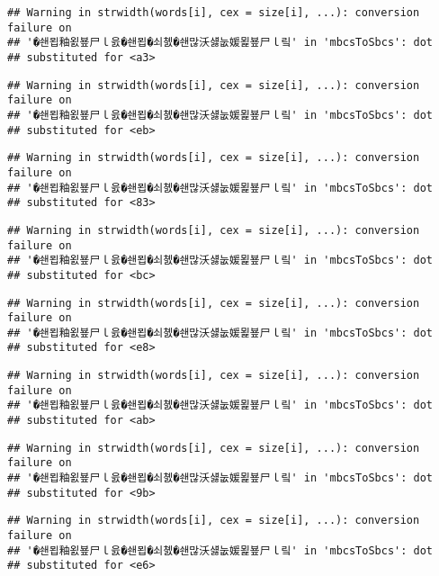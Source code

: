 \documentclass[]{article}
\begin{document}
\begin{verbatim}
## Warning in strwidth(words[i], cex = size[i], ...): conversion failure on
## '�쇈묍釉욄뵾尸ｌ읈�쇈묍�쇠쳸�쇈많沃섏눖媛묉뵾尸ｌ맄' in 'mbcsToSbcs': dot
## substituted for <a3>
\end{verbatim}

\begin{verbatim}
## Warning in strwidth(words[i], cex = size[i], ...): conversion failure on
## '�쇈묍釉욄뵾尸ｌ읈�쇈묍�쇠쳸�쇈많沃섏눖媛묉뵾尸ｌ맄' in 'mbcsToSbcs': dot
## substituted for <eb>
\end{verbatim}

\begin{verbatim}
## Warning in strwidth(words[i], cex = size[i], ...): conversion failure on
## '�쇈묍釉욄뵾尸ｌ읈�쇈묍�쇠쳸�쇈많沃섏눖媛묉뵾尸ｌ맄' in 'mbcsToSbcs': dot
## substituted for <83>
\end{verbatim}

\begin{verbatim}
## Warning in strwidth(words[i], cex = size[i], ...): conversion failure on
## '�쇈묍釉욄뵾尸ｌ읈�쇈묍�쇠쳸�쇈많沃섏눖媛묉뵾尸ｌ맄' in 'mbcsToSbcs': dot
## substituted for <bc>
\end{verbatim}

\begin{verbatim}
## Warning in strwidth(words[i], cex = size[i], ...): conversion failure on
## '�쇈묍釉욄뵾尸ｌ읈�쇈묍�쇠쳸�쇈많沃섏눖媛묉뵾尸ｌ맄' in 'mbcsToSbcs': dot
## substituted for <e8>
\end{verbatim}

\begin{verbatim}
## Warning in strwidth(words[i], cex = size[i], ...): conversion failure on
## '�쇈묍釉욄뵾尸ｌ읈�쇈묍�쇠쳸�쇈많沃섏눖媛묉뵾尸ｌ맄' in 'mbcsToSbcs': dot
## substituted for <ab>
\end{verbatim}

\begin{verbatim}
## Warning in strwidth(words[i], cex = size[i], ...): conversion failure on
## '�쇈묍釉욄뵾尸ｌ읈�쇈묍�쇠쳸�쇈많沃섏눖媛묉뵾尸ｌ맄' in 'mbcsToSbcs': dot
## substituted for <9b>
\end{verbatim}

\begin{verbatim}
## Warning in strwidth(words[i], cex = size[i], ...): conversion failure on
## '�쇈묍釉욄뵾尸ｌ읈�쇈묍�쇠쳸�쇈많沃섏눖媛묉뵾尸ｌ맄' in 'mbcsToSbcs': dot
## substituted for <e6>
\end{verbatim}
\end{document}

